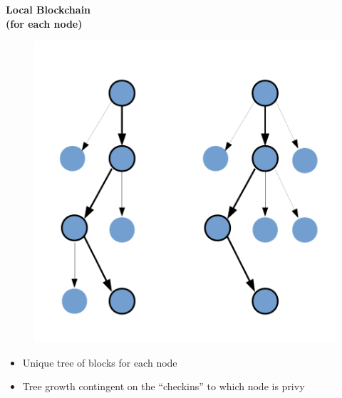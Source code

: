 \documentclass{beamer}
\begin{document}
\begin{frame}
\begin{columns}
		\begin{column}{0.3\textwidth}
			\centering
			\textbf{Local Blockchain \\ (for each node)}
			\begin{figure}
				\includegraphics[width=\textwidth]{fork_fig.pdf}
			\end{figure}
			\begin{scriptsize}
				\begin{itemize}
					\item Unique tree of blocks for each node
					\item Tree growth contingent on the ``checkins'' to which
						node is privy
				\end{itemize}
			\end{scriptsize}
		\end{column}

		\vrule{}


\end{columns}
\end{frame}
\end{document}
